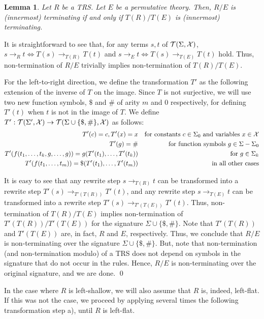 \documentclass{LMCS}
\theoremstyle{plain}
\newtheorem{lemma}[thm]{Lemma}
\def\Tau{{\mathcal T}}
\begin{document}
\begin{lemma}\label{lemma-simplifying1}
Let $R$ be a TRS. Let $E$ be a permutative theory.
Then, $R/E$ is (innermost) terminating if and only if $T(R)/T(E)$
is (innermost) terminating.
\end{lemma}

\proof
It is straightforward to see that, for any terms $s,t$
of $\Tau(\Sigma,\X)$,
$s\to_{R}t\Leftrightarrow T(s)\to_{T(R)}T(t)$
and $s\to_{E}t\Leftrightarrow T(s)\to_{T(E)}T(t)$ hold.
Thus, non-termination of $R/E$ trivially implies non-termination
of $T(R)/T(E)$.

For the left-to-right direction,
we define the 
transformation $T'$ as the following extension of the inverse of $T$
on the image. 
Since $T$ is not surjective, we will use two new function symbols,
$\$$ and $\#$ of arity $m$ and $0$ respectively, for defining
$T'(t)$ when $t$ is not in the image of $T$.
We define
$T':\Tau(\Sigma',\X)\rightarrow \Tau(\Sigma\cup\{\$,\#\},\X)$
as follows:
\begin{eqnarray*}
T'(c) = c, T'(x)=x & & \mbox{for constants $c\in\Sigma_0$ and variables $x\in{\mathcal X}$}
\\
T'(g)=\#  & & \mbox{for function symbols $g\in\Sigma-\Sigma_0$}
\\
T'(f(t_1,\ldots,t_k,g,\ldots,g)) = g(T'(t_1),\ldots,T'(t_k)) & & \mbox{for $g\in\Sigma_k$}
\\
T'(f(t_1,\ldots,t_m))=\$(T'(t_1),\ldots,T'(t_m)) & & \mbox{in all other cases}
\end{eqnarray*}

It is easy to see that any rewrite step
$s\to_{T(R)}t$ can be transformed into
a rewrite step $T'(s)\to_{T'(T(R))}T'(t)$,
and any rewrite step
$s\to_{T(E)}t$ can be transformed into
a rewrite step $T'(s)\to_{T'(T(E))}T'(t)$.
Thus, non-termination of $T(R)/T(E)$ implies non-termination
of $T'(T(R))/T'(T(E))$ for the signature
$\Sigma\cup\{\$,\#\}$. Note that $T'(T(R))$ and $T'(T(E))$
are, in fact, $R$ and $E$, respectively. Thus, we conclude that
$R/E$ is non-terminating over the signature
$\Sigma\cup\{\$,\#\}$. But, note that
non-termination (and non-termination modulo) of a TRS
does not depend on symbols in the signature that
do not occur in the rules. Hence, $R/E$ is non-terminating
over the original signature, and we are done.
\qed


In the case where $R$ is left-shallow, we will also assume
that $R$ is, indeed, left-flat. If this was not the case,
we proceed by applying several times the following
transformation step a), until $R$ is left-flat.
\end{document}
